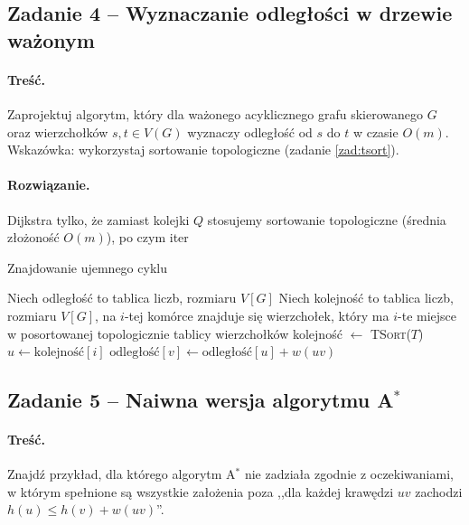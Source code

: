 \subsection{Zadanie 4 -- Wyznaczanie odległości w drzewie ważonym}
\paragraph{Treść.}Zaprojektuj algorytm, który dla ważonego 
acyklicznego grafu skierowanego $G$ oraz wierzchołków $s, t \in
V(G)$ wyznaczy odległość od $s$ do $t$ w czasie $O(m)$. 
Wskazówka: wykorzystaj sortowanie topologiczne (zadanie \ref{zad:tsort}).

\paragraph{Rozwiązanie.}
Dijkstra tylko, że zamiast kolejki $Q$ stosujemy
sortowanie topologiczne (średnia złożoność $O(m)$), 
po czym iter %
\begin{algorithm}[H]
	\caption{Znajdowanie ujemnego cyklu}
	\begin{algorithmic}[1]
		\State Niech odległość to tablica liczb, rozmiaru $V[G]$
		\State Niech kolejność to tablica liczb, rozmiaru $V[G]$, na
		$i$-tej komórce znajduje się wierzchołek, który ma 
		$i$-te miejsce w posortowanej topologicznie tablicy wierzchołków
		\State kolejność $\gets$ \textsc{TSort}($T$)
		\State $u \gets \text{kolejność}[i]$
		\State $\text{odległość}[v] \gets \text{odległość}[u] + w(uv)$
		\EndIf
		\EndFor 
		\EndFor
		\State \Return \false
		\EndProcedure
	\end{algorithmic}
	\label{Zadanie34}
\end{algorithm}

\subsection{Zadanie 5 -- Naiwna wersja algorytmu A\texorpdfstring{$^*$}{TEXT}}
\paragraph{Treść.}Znajdź przykład, dla 
którego algorytm A$^*$ nie zadziała zgodnie z oczekiwaniami, 
w którym spełnione
są wszystkie założenia 
poza 
,,dla każdej krawędzi $uv$ zachodzi $h(u) \leq h(v) + w(uv)$''.

